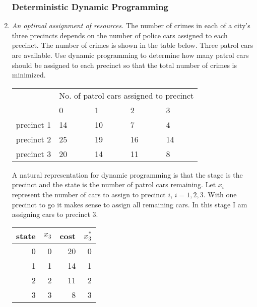 \begin{enumerate}
\begin{comment}
suffix up OUT;
suffix down OUT;
suffix current OUT;
ampl: display x;
x :=
bemidji      divA   1
bemidji      divB   0
crookston    divA   1
crookston    divB   0
detroitlakes divA   0
detroitlakes divB   1
parkrapids   divA   0
parkrapids   divB   1
;  
\end{Verbatim}
\end{solution}
\end{comment}

\subsubsection*{Deterministic Dynamic Programming}

\item \emph{An optimal assignment of resources.} 
The number of crimes in each of a city's three
  precincts depends on the number of police cars assigned to each
  precinct. The number of crimes is shown in the table below. Three
  patrol cars are available. Use dynamic programming to determine how
  many patrol cars should be assigned to each precinct so that the
  total number of crimes is minimized.

  \begin{center}
  \begin{tabularx}{3.5in}{r|XXXX}
    & \multicolumn{4}{c}{No. of patrol cars assigned to precinct} \\
    &0 & 1 & 2 & 3 \\ \hline
    precinct 1 & 14 & 10 & 7 & 4 \\
    precinct 2 & 25 & 19 & 16 & 14 \\
    precinct 3 & 20 & 14 & 11 & 8
  \end{tabularx}
\end{center}

\begin{solution}
  \bs A natural representation for dynamic programming is that the
  stage is the precinct and the state is the number of patrol cars
  remaining. Let $x_i$ represent the number of cars to assign to
  precinct $i$, $i = 1,2,3$. With one precinct to go it makes sense to
  assign all remaining cars. In this stage I am assigning cars to
  precinct 3.

  \begin{tabular}{rrrr}
    state & $x_3$ & cost & $x_3^{\ast}$ \\ \hline
    0 & 0 & 20 & 0 \\
    1 & 1 & 14 & 1 \\
    2 & 2 & 11 & 2 \\
    3 & 3 & 8 & 3
  \end{tabular}


\end{solution}
\end{enumerate}
